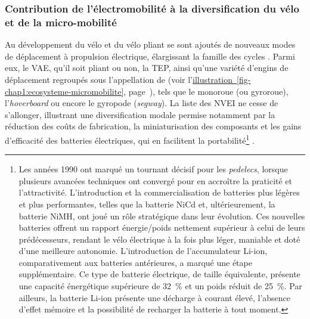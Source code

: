 \begin{refsegment}
\subsubsection*{Contribution de l'électromobilité à la diversification du vélo et de la micro-mobilité
    \label{chap1:velo-micromobilite-innovations-electromobilite}
    }

Au développement du vélo et du vélo pliant se sont ajoutés de nouveaux modes de déplacement à propulsion électrique, élargissant la famille des cycles \textcolor{blue}{\autocite[5]{lopez-escolano_mobilites_2019}}. Parmi eux, le \acrfull{VAE}, qu’il soit pliant ou non, la \acrfull{TEP}, ainsi qu’une variété d’engins de déplacement regroupés sous l’appellation de  (voir l'\hyperref[fig-chap1:ecosysteme-micromobilite]{illustration~\ref{fig-chap1:ecosysteme-micromobilite}}, page~\pageref{fig-chap1:ecosysteme-micromobilite}), tels que le monoroue (ou gyroroue), l’\textsl{hoverboard} ou encore le gyropode (\textsl{segway}). La liste des \acrfull{NVEI} ne cesse de s’allonger, illustrant une diversification modale permise notamment par la réduction des coûts de fabrication, la miniaturisation des composants et les gains d’efficacité des batteries électriques, qui en facilitent la portabilité\footnote{
    Les années 1990 ont marqué un tournant décisif pour les \textsl{pedelecs}, lorsque plusieurs avancées techniques ont convergé pour en accroître la praticité et l’attractivité. L’introduction et la commercialisation de batteries plus légères et plus performantes, telles que la batterie \acrfull{NiCd} et, ultérieurement, la batterie \acrfull{NiMH}, ont joué un rôle stratégique dans leur évolution. Ces nouvelles batteries offrent un rapport énergie/poids nettement supérieur à celui de leurs prédécesseurs, rendant le vélo électrique à la fois plus léger, maniable et doté d’une meilleure autonomie. L’introduction de l'accumulateur \acrfull{Li-ion}, comparativement aux batteries antérieures, a marqué une étape supplémentaire. Ce type de batterie électrique, de taille équivalente, présente une capacité énergétique supérieure de 32~\% et un poids réduit de 25~\%. Par ailleurs, la batterie \acrshort{Li-ion} présente une décharge à courant élevé, l’absence d’effet mémoire et la possibilité de recharger la batterie à tout moment.
} \textcolor{blue}{\autocites[430]{bertoluzzo_development_2011}[2]{schultz_micromobility_2019}[430]{pages_nouveaux_2021}}.%


\end{refsegment}
